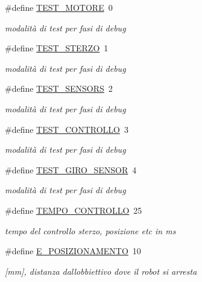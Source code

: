 \begin{DoxyCompactItemize}
\#define \mbox{\hyperlink{ari_pi__2_d_c__esp__08_8ino_a61f762ee849a4b411a7cc07d78dde55d}{T\+E\+S\+T\+\_\+\+M\+O\+T\+O\+RE}}~0
\begin{DoxyCompactList}\small\item\em modalità di test per fasi di debug \end{DoxyCompactList}\item 
\#define \mbox{\hyperlink{ari_pi__2_d_c__esp__08_8ino_a3e6a2d7b0da74a50b9fd5b16aace4414}{T\+E\+S\+T\+\_\+\+S\+T\+E\+R\+ZO}}~1
\begin{DoxyCompactList}\small\item\em modalità di test per fasi di debug \end{DoxyCompactList}\item 
\#define \mbox{\hyperlink{ari_pi__2_d_c__esp__08_8ino_addf0ed25cb1de6ac65f3f60a7f50c01a}{T\+E\+S\+T\+\_\+\+S\+E\+N\+S\+O\+RS}}~2
\begin{DoxyCompactList}\small\item\em modalità di test per fasi di debug \end{DoxyCompactList}\item 
\#define \mbox{\hyperlink{ari_pi__2_d_c__esp__08_8ino_ab57f62e8f32f367dbca255771ff72e20}{T\+E\+S\+T\+\_\+\+C\+O\+N\+T\+R\+O\+L\+LO}}~3
\begin{DoxyCompactList}\small\item\em modalità di test per fasi di debug \end{DoxyCompactList}\item 
\#define \mbox{\hyperlink{ari_pi__2_d_c__esp__08_8ino_adcc6c25175a8908813ff718bc774c2ab}{T\+E\+S\+T\+\_\+\+G\+I\+R\+O\+\_\+\+S\+E\+N\+S\+OR}}~4
\begin{DoxyCompactList}\small\item\em modalità di test per fasi di debug \end{DoxyCompactList}\item 
\#define \mbox{\hyperlink{ari_pi__2_d_c__esp__08_8ino_ab6c0fc0e0028f3917b0ce67bee73d01e}{T\+E\+M\+P\+O\+\_\+\+C\+O\+N\+T\+R\+O\+L\+LO}}~25
\begin{DoxyCompactList}\small\item\em tempo del controllo sterzo, posizione etc in ms \end{DoxyCompactList}\item 
\#define \mbox{\hyperlink{ari_pi__2_d_c__esp__08_8ino_a140e19c4b6cb883d0f3abceea67a62ba}{E\+\_\+\+P\+O\+S\+I\+Z\+I\+O\+N\+A\+M\+E\+N\+TO}}~10
\begin{DoxyCompactList}\small\item\em \mbox{[}mm\mbox{]}, distanza dall\textquotesingle{}obbiettivo dove il robot si arresta \end{DoxyCompactList}\item 

\end{DoxyCompactItemize}
